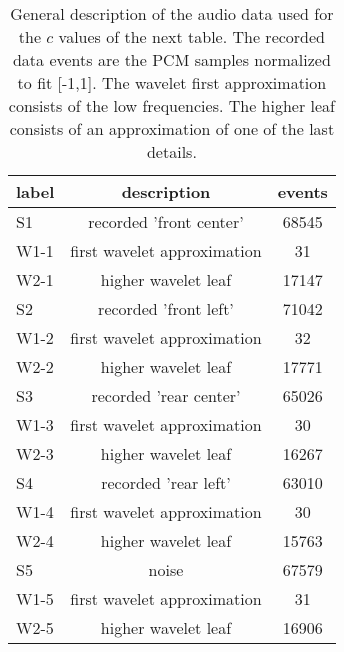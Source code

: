 \begin{table}[h!]
\begin{center}
\begin{tabular}{| l | c | c |}\hline
label & description & events \\\hline
S1 & recorded 'front center' & 68545 \\\hline
W1-1 & first wavelet approximation & 31 \\\hline
W2-1 & higher wavelet leaf & 17147 \\\hline
S2 & recorded 'front left' & 71042 \\\hline
W1-2 & first wavelet approximation & 32 \\\hline
W2-2 & higher wavelet leaf & 17771 \\\hline
S3 & recorded 'rear center' & 65026 \\\hline
W1-3 & first wavelet approximation & 30 \\\hline
W2-3 & higher wavelet leaf & 16267 \\\hline
S4 & recorded 'rear left' & 63010 \\\hline
W1-4 & first wavelet approximation & 30 \\\hline
W2-4 & higher wavelet leaf & 15763 \\\hline
S5 & noise & 67579 \\\hline
W1-5 & first wavelet approximation & 31 \\\hline
W2-5 & higher wavelet leaf & 16906 \\\hline
\end{tabular}
\caption{General description of the audio data used for the $c$ values of the next table.
The recorded data events are the PCM samples normalized to fit [-1,1].
The wavelet first approximation consists of the low frequencies.
The higher leaf consists of an approximation of one of the last details.}
\end{center}
\end{table}